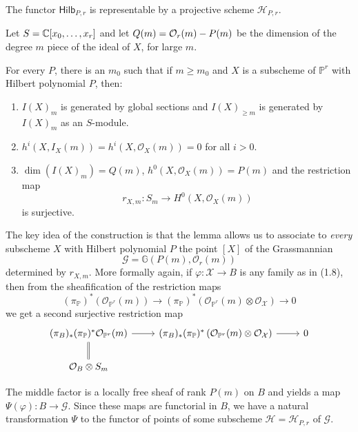 \documentclass[12pt]{article}
\begin{document}
\begin{theorem}[Grothendieck]
    The functor $\mathsf{Hilb}_{P,r}$ is representable by a projective scheme $\mathcal{H}_{P,r}$.
\end{theorem}

Let $S = \mathbb{C}[x_0, \ldots, x_r]$ and let $Q(m) = {\mathcal{O}}_r(m) - P(m)$ be the dimension of the degree $m$ piece of the ideal of $X$, for large $m$.
\begin{lemma}
    For every $P$, there is an $m_0$ such that if $m \geq m_0$ and $X$ is a subscheme of $\mathbb{P}^r$ with Hilbert polynomial $P$, then:

    \begin{enumerate}
        \item $I(X)_m$ is generated by global sections and $I(X)_{\geq m}$ is generated by $I(X)_m$ as an $S$-module.

        \item $h^i(X, I_X(m)) = h^i(X, \mathcal{O}_X(m)) = 0$ for all $i > 0$.

        \item $\dim(I(X)_m) = Q(m)$, $h^0(X, \mathcal{O}_X(m)) = P(m)$ and the restriction map
              \[
                  r_{X,m} : S_m \rightarrow H^0(X, \mathcal{O}_X(m))
              \]
              is surjective.
    \end{enumerate}
\end{lemma}


The key idea of the construction is that the lemma allows us to associate to \emph{every} subscheme $X$ with Hilbert polynomial $P$ the point $[X]$ of the Grassmannian
\[
    \mathcal{G} = \mathbb{G}(P(m), \mathcal{O}_r(m))
\]
determined by $r_{X,m}$. More formally again, if $\varphi : \mathcal{X} \to B$ is any family as in (1.8), then from the sheafification of the restriction maps
\[
    (\pi_{\mathbb{P}})^*(\mathcal{O}_{\mathbb{P}^r}(m)) \longrightarrow (\pi_{\mathbb{P}})^*(\mathcal{O}_{\mathbb{P}^r}(m) \otimes \mathcal{O}_\mathcal{X}) \longrightarrow 0
\]
we get a second surjective restriction map
\[
    \begin{tikzcd}
        (\pi_B)_*(\pi_{\mathbb{P}})^* \mathcal{O}_{\mathbb{P}^r}(m) \arrow[r] \arrow[d, equal] &
        (\pi_B)_*(\pi_{\mathbb{P}})^*\left( \mathcal{O}_{\mathbb{P}^r}(m) \otimes \mathcal{O}_{\mathcal{X}} \right) \arrow[r] & 0 \\
        \mathcal{O}_B \otimes S_m &
    \end{tikzcd}
\]

The middle factor is a locally free sheaf of rank $P(m)$ on $B$ and yields a map $\Psi(\varphi) : B \to \mathcal{G}$. Since these maps are functorial in $B$, we have a natural transformation $\Psi$ to the functor of points of some subscheme $\mathcal{H} = \mathcal{H}_{P,r}$ of $\mathcal{G}$.
\end{document}
